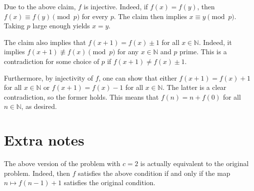 \documentclass{article}
\newcommand{\N}{\mathbb{N}}
\begin{document}
Due to the above claim, $f$ is injective.
Indeed, if $f(x) = f(y)$, then $f(x) \equiv f(y) \pmod{p}$ for every $p$.
The claim then implies $x \equiv y \pmod{p}$.
Taking $p$ large enough yields $x = y$.

The claim also implies that $f(x + 1) = f(x) \pm 1$ for all $x \in \N$.
Indeed, it implies $f(x + 1) \not\equiv f(x) \pmod{p}$ for any $x \in \N$ and $p$ prime.
This is a contradiction for some choice of $p$ if $f(x + 1) \neq f(x) \pm 1$.

Furthermore, by injectivity of $f$, one can show that either $f(x + 1) = f(x) + 1$ for all $x \in \N$ or $f(x + 1) = f(x) - 1$ for all $x \in \N$.
The latter is a clear contradiction, so the former holds.
This means that $f(n) = n + f(0)$ for all $n \in \N$, as desired.



\section*{Extra notes}

The above version of the problem with $c = 2$ is actually equivalent to the original problem.
Indeed, then $f$ satisfies the above condition if and only if the map $n \mapsto f(n - 1) + 1$ satisfies the original condition.
\end{document}
